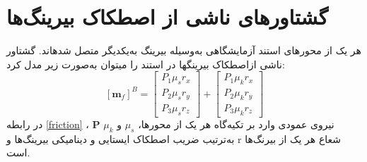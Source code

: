 \section{گشتاورهای ناشی از اصطكاک بیرينگ‌ها}
هر یک از محورهای استند آزمایشگاهی به‌وسیله بیرینگ به‌یکدیگر متصل شدهاند. گشتاور ناشی ازاصطکاک بیرینگها در استند را میتوان به‌صورت زیر مدل کرد:
\begin{equation}\label{friction}
	[\boldsymbol m_f]^B = \begin{bmatrix}
		P_1\mu_sr_x \\
		P_2\mu_sr_y \\
		P_3\mu_sr_z
	\end{bmatrix} + \begin{bmatrix}
	P_1\mu_kr_x \\
	P_2\mu_kr_y \\
	P_3\mu_kr_z
\end{bmatrix}
\end{equation}
در رابطه \ref{friction}
 ، $\boldsymbol P$ نیروی عمودی وارد بر تکیه‌گاه هر یک از محورها، $\mu_s$ و $\mu_k$ به‌ترتیب ضریب اصطکاک
ایستایی و دینامیکی بیرینگ‌ها و r شعاع هر یک از بیرنگ‌ها است.

